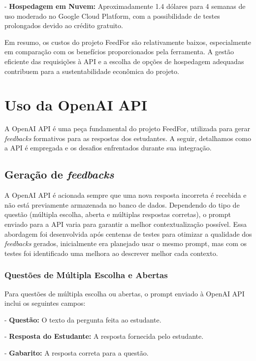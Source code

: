 - \textbf{Hospedagem em Nuvem:} Aproximadamente 1.4 dólares para 4 semanas de uso moderado no Google Cloud Platform, com a possibilidade de testes prolongados devido ao crédito gratuito.

Em resumo, os custos do projeto FeedFor são relativamente baixos, especialmente em comparação com os benefícios proporcionados pela ferramenta. A gestão eficiente das requisições à API e a escolha de opções de hospedagem adequadas contribuem para a sustentabilidade econômica do projeto.

\section{Uso da OpenAI API}

A OpenAI API é uma peça fundamental do projeto FeedFor, utilizada para gerar \textit{feedbacks} formativos para as respostas dos estudantes. A seguir, detalhamos como a API é empregada e os desafios enfrentados durante sua integração.

\subsection{Geração de \textit{feedbacks}}

A OpenAI API é acionada sempre que uma nova resposta incorreta é recebida e não está previamente armazenada no banco de dados. Dependendo do tipo de questão (múltipla escolha, aberta e múltiplas respostas corretas), o prompt enviado para a API varia para garantir a melhor contextualização possível. Essa abordagem foi desenvolvida após centenas de testes para otimizar a qualidade dos \textit{feedbacks} gerados, inicialmente era planejado usar o mesmo prompt, mas com os testes foi identificado uma melhora ao descrever melhor cada contexto.

\subsubsection{Questões de Múltipla Escolha e Abertas}

Para questões de múltipla escolha ou abertas, o prompt enviado à OpenAI API inclui os seguintes campos:

- \textbf{Questão:} O texto da pergunta feita ao estudante.

- \textbf{Resposta do Estudante:} A resposta fornecida pelo estudante.

- \textbf{Gabarito:} A resposta correta para a questão.

